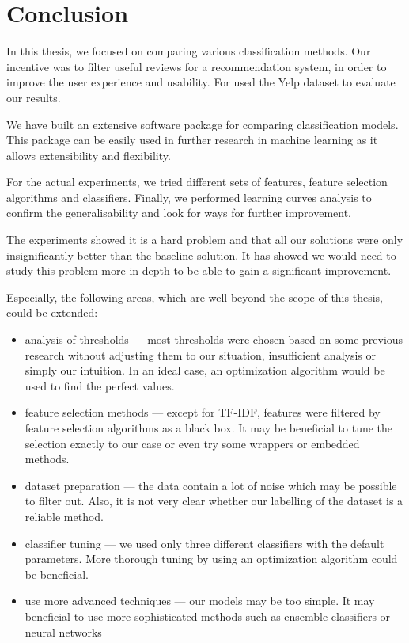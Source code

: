 \chapter*{Conclusion}\label{chap:concl}

In this thesis, we focused on comparing various classification methods.
Our incentive was to filter useful reviews for a recommendation system,
in order to improve the user experience and usability.
For used the Yelp dataset to evaluate our results.

We have built an extensive software package for comparing classification models.
This package can be easily used in further research in machine learning 
as it allows extensibility and flexibility.

For the actual experiments, we tried different sets of features, feature selection algorithms and
classifiers.
Finally, we performed learning curves analysis to confirm the generalisability and look for
ways for further improvement.

The experiments showed it is a hard problem 
and that all our solutions were only insignificantly better than the baseline solution.
It has showed
we would need to study this problem more in depth to be able to gain a significant improvement.

Especially, the following areas, which are well beyond the scope of this thesis, could be extended:

\begin{itemize}

\item analysis of thresholds ---
most thresholds were chosen based on some previous research without adjusting them to our situation, insufficient analysis or simply our intuition.
In an ideal case, an optimization algorithm would be used to find the perfect values.

\item feature selection methods ---
except for TF-IDF, features were filtered by feature selection algorithms as a black box.
It may be beneficial to tune the selection exactly to our case or even try some wrappers or embedded methods.

\item dataset preparation ---
the data contain a lot of noise which may be possible to filter out.
Also, it is not very clear whether our labelling of the dataset is a reliable method.

\item classifier tuning ---
we used only three different classifiers with the default parameters.
More thorough tuning by using an optimization algorithm could be beneficial.

\item use more advanced techniques ---
our models may be too simple.
It may beneficial to use more sophisticated methods
such as ensemble classifiers or neural networks
 
\end{itemize}
